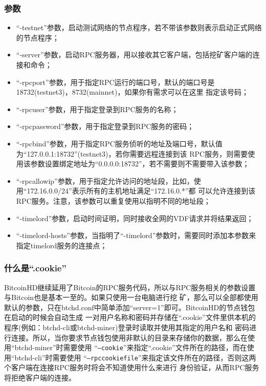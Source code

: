 \subsubsection{参数}
\begin{itemize}
    \item ``-testnet''参数，启动测试网络的节点程序，若不带该参数则表示启动正式网络的节点程序；
    \item ``-server''参数，启动RPC服务器，用以接收其它客户端，包括挖矿客户端的连接和命令；
    \item ``-rpcport''参数，用于指定RPC运行的端口号，默认的端口号是18732(testnet3)，8732(mainnet)，如果你有需求可以在这里
        指定该号码；
    \item ``-rpcuser''参数，用于指定登录到RPC服务的名称；
    \item ``-rpcpassword''参数，用于指定登录到RPC服务的密码；
    \item ``-rpcbind''参数，用于指定RPC服务侦听的地址及端口号，默认值为``127.0.0.1:18732''(testnet3)，若你需要远程连接到该
        RPC服务，则需要使用该参数设置绑定地址为``0.0.0.0:18732''，若不需要则不需要带入该参数；
    \item ``-rpcallowip''参数，用于指定允许访问的地址段，比如，使用``172.16.0.0/24''表示所有的主机地址满足``172.16.0.*''都
        可以允许连接到该RPC服务。注意，该参数可以重复使用以指明不同的地址段；
    \item ``-timelord''参数，启动时间证明，同时接收全网的VDF请求并将结果返回；
    \item ``-timelord-hosts''参数，当指明了``-timelord''参数时，需要同时添加本参数来指定timelord服务的连接点；
\end{itemize}
\subsubsection{什么是``.cookie''}
\begin{flushleft}
    BitcoinHD继续延用了Bitcoin的RPC服务代码，所以与RPC服务相关的参数设置与Bitcoin也是基本一至的。如果只使用一台电脑进行挖
    矿，那么可以全部都使用默认的参数，只在btchd.conf中简单添加``server=1''即可。BitcoinHD的节点钱包在启动的时候会自动生成
    一对用户名称和密码并存储在``.cookie''文件里供本机的程序(例如：btchd-cli或btchd-miner)登录时读取并使用其指定的用户名和
    密码进行连接。所以，当你要求节点钱包使用非默认的目录来存储你的数据，那么在使用``btchd-miner''时需要使用
    ``\texttt{--cookie}''来指定``.cookie''文件所在的路径，而在使用``btchd-cli''时需要使用
    ``\texttt{--rpccookiefile}''来指定该文件所在的路径，否则这两个客户端在连接RPC服务时将会不知道使用什么来进行
    身份验证，从而RPC服务将拒绝客户端的连接。
\end{flushleft}
